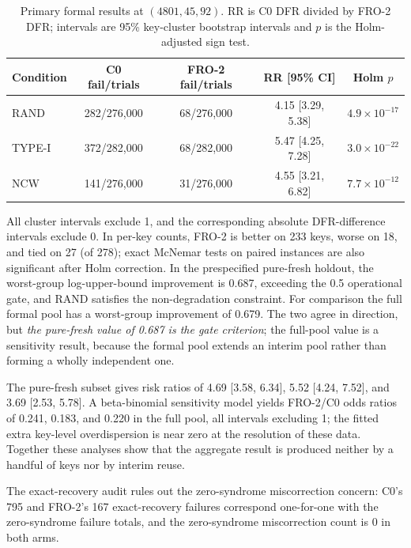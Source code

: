 \documentclass[lettersize,journal]{IEEEtran}
\begin{document}
\begin{table}[t]
\centering
\caption{Primary formal results at $(4801,45,92)$. RR is C0 DFR divided by FRO-2 DFR; intervals are 95\% key-cluster bootstrap intervals and $p$ is the Holm-adjusted sign test.}
\label{tab:main}
\footnotesize
\setlength{\tabcolsep}{3pt}
\begin{tabular}{@{}lcccc@{}}
\toprule
Condition & C0 fail/trials & FRO-2 fail/trials & RR [95\% CI] & Holm $p$ \\
\midrule
RAND & 282/276{,}000 & 68/276{,}000 & 4.15 [3.29, 5.38] & $4.9\times10^{-17}$ \\
TYPE-I & 372/282{,}000 & 68/282{,}000 & 5.47 [4.25, 7.28] & $3.0\times10^{-22}$ \\
NCW & 141/276{,}000 & 31/276{,}000 & 4.55 [3.21, 6.82] & $7.7\times10^{-12}$ \\
\bottomrule
\end{tabular}
\end{table}

All cluster intervals exclude 1, and the corresponding absolute DFR-difference intervals exclude 0. In per-key counts, FRO-2 is better on 233 keys, worse on 18, and tied on 27 (of 278); exact McNemar tests on paired instances are also significant after Holm correction. In the prespecified pure-fresh holdout, the worst-group log-upper-bound improvement is 0.687, exceeding the 0.5 operational gate, and RAND satisfies the non-degradation constraint. For comparison the full formal pool has a worst-group improvement of 0.679. The two agree in direction, but \emph{the pure-fresh value of 0.687 is the gate criterion}; the full-pool value is a sensitivity result, because the formal pool extends an interim pool rather than forming a wholly independent one.

The pure-fresh subset gives risk ratios of 4.69 [3.58, 6.34], 5.52 [4.24, 7.52], and 3.69 [2.53, 5.78]. A beta-binomial sensitivity model yields FRO-2/C0 odds ratios of 0.241, 0.183, and 0.220 in the full pool, all intervals excluding 1; the fitted extra key-level overdispersion is near zero at the resolution of these data. Together these analyses show that the aggregate result is produced neither by a handful of keys nor by interim reuse.

The exact-recovery audit rules out the zero-syndrome miscorrection concern: C0's 795 and FRO-2's 167 exact-recovery failures correspond one-for-one with the zero-syndrome failure totals, and the zero-syndrome miscorrection count is 0 in both arms.
\end{document}
